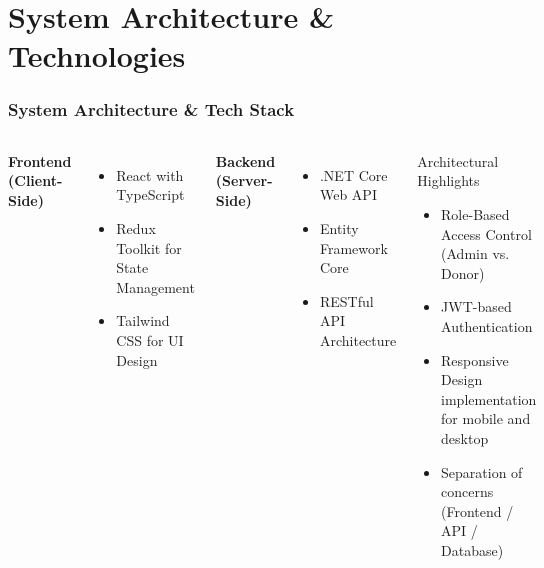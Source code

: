 \documentclass[10pt, compress, aspectratio=169]{beamer}
\begin{document}
\section{System Architecture \& Technologies}
\begin{frame}
    \frametitle{System Architecture \& Tech Stack}
    \begin{columns}
        \textbf{Frontend (Client-Side)}
        \begin{itemize}
            \item React with TypeScript
            \item Redux Toolkit for State Management
            \item Tailwind CSS for UI Design
        \end{itemize}
        
        \vspace{0.4cm}
        \textbf{Backend (Server-Side)}
        \begin{itemize}
            \item .NET Core Web API
            \item Entity Framework Core
            \item RESTful API Architecture
        \end{itemize}
        
        \begin{block}{Architectural Highlights}
            \begin{itemize}
                \item Role-Based Access Control (Admin vs. Donor)
                \item JWT-based Authentication
                \item Responsive Design implementation for mobile and desktop
                \item Separation of concerns (Frontend / API / Database)
            \end{itemize}
        \end{block}
    \end{columns}
\end{frame}

\end{document}
